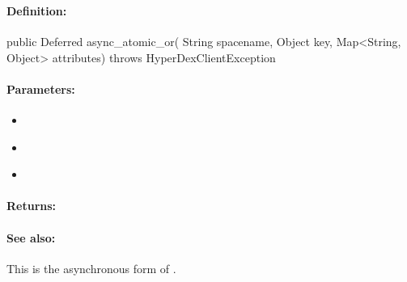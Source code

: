 \pagebreak
\subsubsection{}
\label{api:java:async_atomic_or}


\paragraph{Definition:}
\begin{javacode}
public Deferred async_atomic_or(
        String spacename,
        Object key,
        Map<String, Object> attributes) throws HyperDexClientException
\end{javacode}

\paragraph{Parameters:}
\begin{itemize}[noitemsep]
\item {}\\

\item {}\\

\item {}\\

\end{itemize}

\paragraph{Returns:}


\paragraph{See also:}  This is the asynchronous form of .

\pagebreak
\subsubsection{}
\label{api:java:cond_atomic_or}


